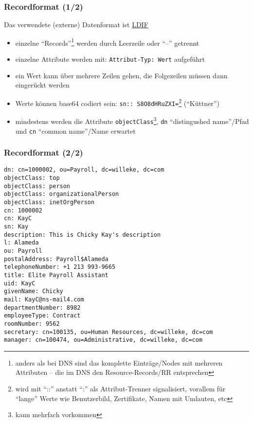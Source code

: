 \documentclass[ignorenonframetext]{beamer}
\begin{document}
\begin{frame}
\frametitle{Recordformat (1/2)}
Das verwendete (externe) Datenformat ist \href{https://en.wikipedia.org/wiki/LDAP_Data_Interchange_Format}{LDIF}
\begin{itemize}
  \item einzelne ``Records''\footnote{anders als bei DNS sind das komplette Eintr\"age/Nodes mit mehreren Attributen -- die im DNS den Resource-Records/RR entsprechen} werden durch Leerzeile oder ``--'' getrennt
  \item einzelne Attribute werden mit: \texttt{Attribut-Typ: Wert} aufgef\"uhrt
  \item ein Wert kann \"uber mehrere Zeilen gehen, die Folgezeilen m\"ussen dann einger\"uckt werden
  \item Werte k\"onnen base64 codiert sein: \texttt{sn:: S8O8dHRuZXI=}\footnote{wird mit ``::'' anstatt ``:'' als Attribut-Trenner signalisiert, vorallem f\"ur ``lange'' Werte wie Benutzerbild, Zertifikate, Namen mit Umlauten, etc} (``K\"uttner'')
  \item mindestens werden die Attribute \texttt{objectClass}\footnote{kann mehrfach vorkommen}, \texttt{dn} ``distingushed name''/Pfad und \texttt{cn} ``common name''/Name erwartet
\end{itemize}
\end{frame}

\begin{frame}[fragile]
\frametitle{Recordformat (2/2)}
\begin{tiny}
\begin{Verbatim}
dn: cn=1000002, ou=Payroll, dc=willeke, dc=com
objectClass: top
objectClass: person
objectClass: organizationalPerson
objectClass: inetOrgPerson
cn: 1000002
cn: KayC
sn: Kay
description: This is Chicky Kay's description
l: Alameda
ou: Payroll
postalAddress: Payroll$Alameda
telephoneNumber: +1 213 993-9665
title: Elite Payroll Assistant
uid: KayC
givenName: Chicky
mail: KayC@ns-mail4.com
departmentNumber: 8982
employeeType: Contract
roomNumber: 9562
secretary: cn=100135, ou=Human Resources, dc=willeke, dc=com
manager: cn=100474, ou=Administrative, dc=willeke, dc=com 
\end{Verbatim}
\end{tiny}
\end{frame}
\end{document}
